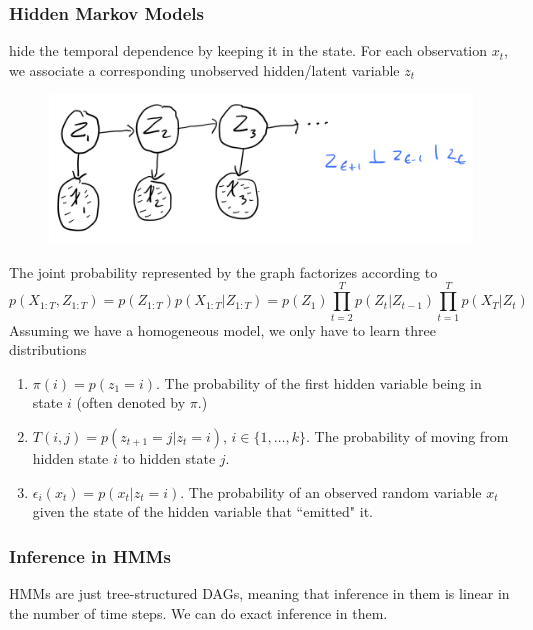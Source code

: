 \documentclass[11pt]{article}
\begin{document}
\subsubsection{Hidden Markov Models}
 hide the temporal dependence by keeping it in the  state. For each observation $x_t$, we associate a corresponding unobserved hidden/latent variable $z_t$
\begin{figure}[H]
	\centering
	\includegraphics[scale=0.6]{p2.png}
\end{figure}
The joint probability represented by the graph factorizes according to
$$p(X_{1:T}, Z_{1:T}) = p(Z_{1:T})p(X_{1:T}|Z_{1:T}) = p(Z_1)\prod_{t=2}^Tp(Z_t|Z_{t-1})\prod_{t=1}^T p(X_T|Z_t)$$
Assuming we have a homogeneous model, we only have to learn three distributions
\begin{enumerate}
	\item {} $\pi(i) = p(z_1 = i)$. The probability of the first hidden variable being in state $i$ (often denoted by $\pi$.)
	\item {} $T(i,j) = p(z_{t+1} = j|z_t = i), \, i \in \{1, \hdots, k\}$. The probability of moving from hidden state $i$ to hidden state $j$.
	\item {} $\epsilon_i(x_t) = p(x_t|z_t=i)$. The probability of an observed random variable $x_t$ given the state of the hidden variable that ``emitted" it.
\end{enumerate}

\subsubsection{Inference in HMMs}
HMMs are just tree-structured DAGs, meaning that inference in them is linear in the number of time steps. We can do exact inference in them.
\end{document}

